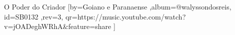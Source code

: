 \beginsong
{O Poder do Criador %
}[by={Goiano e Paranaense %
},album={@walyssondosreis},
id={SB0132 %
},rev={3}, %
qr={https://music.youtube.com/watch?v=jOADeghWRhA&feature=share %
}]
\lstset{basicstyle=\scriptsize\bf} %
\beginverse 

